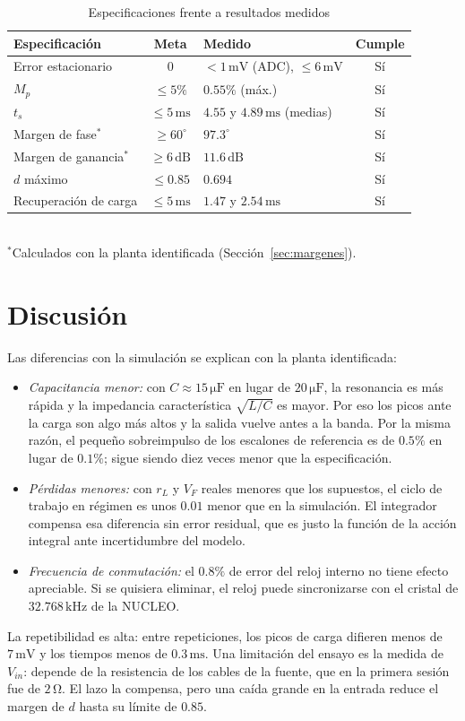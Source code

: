\documentclass[conference,letterpaper]{IEEEtran}
\newcommand{\unit}[1]{\,\mathrm{#1}}
\begin{document}
\begin{table}[H]\caption{Especificaciones frente a resultados medidos}\label{tab:resumen}\centering\footnotesize\setlength{\tabcolsep}{2pt}\renewcommand{\arraystretch}{1.15}\begin{tabularx}{\columnwidth}{LcYc}\toprule
Especificación & Meta & Medido & Cumple\\\midrule
Error estacionario & $0$ & $<1\unit{mV}$ (ADC), $\le6\unit{mV}$ & Sí\\
$M_p$ & $\le5\%$ & $0.55\%$ (máx.) & Sí\\
$t_s$ & $\le5\unit{ms}$ & $4.55$ y $4.89\unit{ms}$ (medias) & Sí\\
Margen de fase$^{*}$ & $\ge60^\circ$ & $97.3^\circ$ & Sí\\
Margen de ganancia$^{*}$ & $\ge6\unit{dB}$ & $11.6\unit{dB}$ & Sí\\
$d$ máximo & $\le0.85$ & $0.694$ & Sí\\
Recuperación de carga & $\le5\unit{ms}$ & $1.47$ y $2.54\unit{ms}$ & Sí\\\bottomrule\end{tabularx}
\\[2pt]\footnotesize $^{*}$Calculados con la planta identificada (Sección~\ref{sec:margenes}).\end{table}

\section{Discusión}\label{sec:disc}
Las diferencias con la simulación se explican con la planta identificada:
\begin{itemize}
\item \emph{Capacitancia menor:} con $C\approx15\unit{\mu F}$ en lugar de $20\unit{\mu F}$, la resonancia es más rápida y la impedancia característica $\sqrt{L/C}$ es mayor. Por eso los picos ante la carga son algo más altos y la salida vuelve antes a la banda. Por la misma razón, el pequeño sobreimpulso de los escalones de referencia es de $0.5\%$ en lugar de $0.1\%$; sigue siendo diez veces menor que la especificación.
\item \emph{Pérdidas menores:} con $r_L$ y $V_F$ reales menores que los supuestos, el ciclo de trabajo en régimen es unos $0.01$ menor que en la simulación. El integrador compensa esa diferencia sin error residual, que es justo la función de la acción integral ante incertidumbre del modelo.
\item \emph{Frecuencia de conmutación:} el $0.8\%$ de error del reloj interno no tiene efecto apreciable. Si se quisiera eliminar, el reloj puede sincronizarse con el cristal de $32.768\unit{kHz}$ de la NUCLEO.
\end{itemize}
La repetibilidad es alta: entre repeticiones, los picos de carga difieren menos de $7\unit{mV}$ y los tiempos menos de $0.3\unit{ms}$. Una limitación del ensayo es la medida de $V_{in}$: depende de la resistencia de los cables de la fuente, que en la primera sesión fue de $2\unit{\Omega}$. El lazo la compensa, pero una caída grande en la entrada reduce el margen de $d$ hasta su límite de $0.85$.
\end{document}
